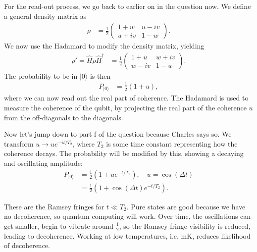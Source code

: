 \documentclass[lasers.tex]{subfiles}
\begin{document}
\begin{example}
    For the read-out process, we go back to earlier on in the question now. 
    We define a general density matrix as
    \begin{align}
        \rho &=  \frac12\begin{pmatrix} 1+w & u-iv \\ u+iv & 1-w\end{pmatrix}.
    \end{align}
    We now use the Hadamard to modify the density matrix, yielding
    \begin{align}
        \rho'= \hat{H}\rho\hat{H}^\dagger &= \frac12\begin{pmatrix} 1+u & w+iv \\ w-iv & 1-u\end{pmatrix}.
    \end{align}
    The probability to be in $|0\rangle$ is then
    \begin{align}
        P_{|0\rangle} &= \frac12(1+u),
    \end{align}
    where we can now read out the real part of coherence.
    The Hadamard is used to measure the coherence of the qubit, by projecting the real part of the coherence $u$ from the off-diagonals to the diagonals.

    Now let's jump down to part f of the question because Charles says so. 
    We transform $u\to ue^{-it/T_2}$, where $T_2$ is some time constant representing how the coherence decays.
    The probability will be modified by this, showing a decaying and oscillating amplitude:
    \begin{align}
        P_{|0\rangle} &= \frac12(1+ue^{-t/T_2}),\quad u=\cos(\Delta t) \\
                      &= \frac12(1+\cos(\Delta t)e^{-t/T_2}).
    \end{align}
    \begin{figure}[H]
        \centering
    \end{figure}
    These are the Ramsey fringes for $t\ll T_2$. 
    Pure states are good because we have no decoherence, so quantum computing will work. 
    Over time, the oscillations can get smaller, begin to vibrate around $\frac12$, so the Ramsey fringe visibility is reduced, leading to decoherence.
    Working at low temperatures, i.e. mK, reduces likelihood of decoherence.
\end{example}
\end{document}
